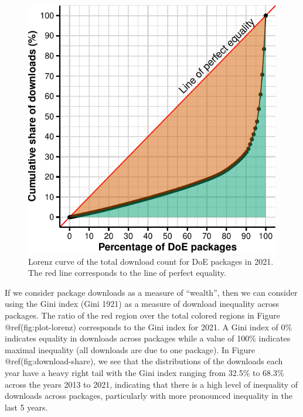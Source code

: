 \documentclass{article}
\begin{document}
\begin{figure}[htbp]

{\centering \includegraphics{figures/plot-lorenz-1} 

}

\caption{Lorenz curve of the total download count for DoE packages in 2021. The red line corresponds to the line of perfect equality.}\label{fig:plot-lorenz}
\end{figure}

If we consider package downloads as a measure of ``wealth'', then we can
consider using the Gini index (Gini 1921) as a measure of download
inequality across packages. The ratio of the red region over the total
colored regions in Figure @ref(fig:plot-lorenz) corresponds to the Gini
index for 2021. A Gini index of 0\% indicates equality in downloads
across packages while a value of 100\% indicates maximal inequality (all
downloads are due to one package). In Figure @ref(fig:download-share),
we see that the distributions of the downloads each year have a heavy
right tail with the Gini index ranging from 32.5\% to 68.3\% across the
years 2013 to 2021, indicating that there is a high level of inequality
of downloads across packages, particularly with more pronounced
inequality in the last 5 years.
\end{document}
